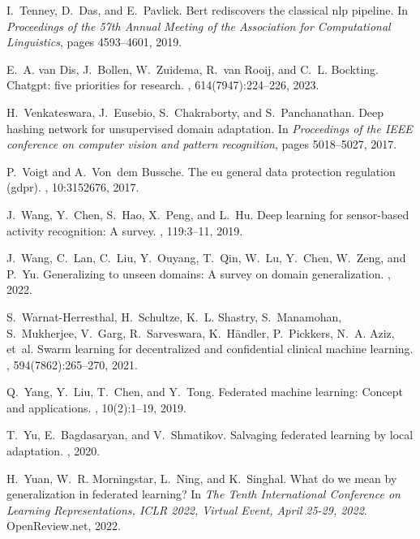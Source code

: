 \documentclass[11pt]{article}
\begin{document}
\begin{thebibliography}{10}
I.~Tenney, D.~Das, and E.~Pavlick.
\newblock Bert rediscovers the classical nlp pipeline.
\newblock In {\em Proceedings of the 57th Annual Meeting of the Association for
  Computational Linguistics}, pages 4593--4601, 2019.

E.~A. van Dis, J.~Bollen, W.~Zuidema, R.~van Rooij, and C.~L. Bockting.
\newblock Chatgpt: five priorities for research.
, 614(7947):224--226, 2023.

H.~Venkateswara, J.~Eusebio, S.~Chakraborty, and S.~Panchanathan.
\newblock Deep hashing network for unsupervised domain adaptation.
\newblock In {\em Proceedings of the IEEE conference on computer vision and
  pattern recognition}, pages 5018--5027, 2017.

P.~Voigt and A.~Von~dem Bussche.
\newblock The eu general data protection regulation (gdpr).
, 10:3152676, 2017.

J.~Wang, Y.~Chen, S.~Hao, X.~Peng, and L.~Hu.
\newblock Deep learning for sensor-based activity recognition: A survey.
, 119:3--11, 2019.

J.~Wang, C.~Lan, C.~Liu, Y.~Ouyang, T.~Qin, W.~Lu, Y.~Chen, W.~Zeng, and P.~Yu.
\newblock Generalizing to unseen domains: A survey on domain generalization.
, 2022.

S.~Warnat-Herresthal, H.~Schultze, K.~L. Shastry, S.~Manamohan, S.~Mukherjee,
  V.~Garg, R.~Sarveswara, K.~H{\"a}ndler, P.~Pickkers, N.~A. Aziz, et~al.
\newblock Swarm learning for decentralized and confidential clinical machine
  learning.
, 594(7862):265--270, 2021.

Q.~Yang, Y.~Liu, T.~Chen, and Y.~Tong.
\newblock Federated machine learning: Concept and applications.
,
  10(2):1--19, 2019.

T.~Yu, E.~Bagdasaryan, and V.~Shmatikov.
\newblock Salvaging federated learning by local adaptation.
, 2020.

H.~Yuan, W.~R. Morningstar, L.~Ning, and K.~Singhal.
\newblock What do we mean by generalization in federated learning?
\newblock In {\em The Tenth International Conference on Learning
  Representations, {ICLR} 2022, Virtual Event, April 25-29, 2022}.
  OpenReview.net, 2022.


\end{thebibliography}
\end{document}
